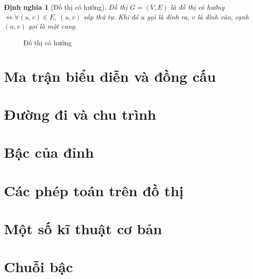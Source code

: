 \documentclass[14pt]{extarticle}
\newtheorem{definition}{Định nghĩa}[section]
\begin{document}
\begin{definition}[Đồ thị có hướng]
	Đồ thị $G=(V,E)$ là đồ thị có hướng $\iff \forall (u,v)\in E,\ (u,v)$ sắp thứ tự. Khi đó $u$ gọi là đỉnh ra, $v$ là đỉnh vào, cạnh $(u,v)$ gọi là một cung.
\end{definition}
\begin{figure}
\begin{center}
\end{center}
\caption{Đồ thị có hướng}
\label{fig:do-thi-co-huong}
\end{figure}



\section{Ma trận biểu diễn và đồng cấu}
\section{Đường đi và chu trình}
\section{Bậc của đỉnh}
\section{Các phép toán trên đồ thị}
\section{Một số kĩ thuật cơ bản}
\section{Chuỗi bậc}
\end{document}
